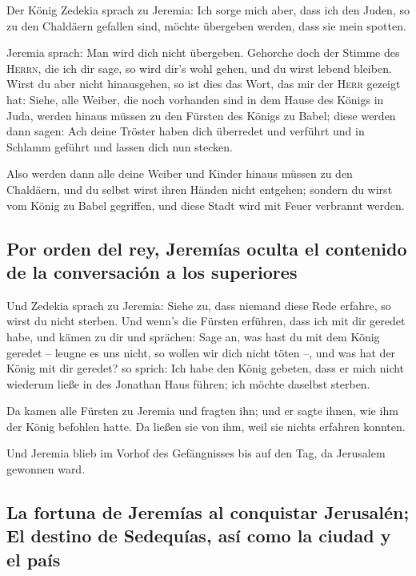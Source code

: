  Der König Zedekia sprach zu Jeremia: Ich sorge mich
aber, dass ich den Juden, so zu den Chaldäern gefallen sind, möchte
übergeben werden, dass sie mein spotten.

 Jeremia sprach: Man wird dich nicht übergeben. Gehorche
doch der Stimme des \textsc{Herrn}, die ich dir sage, so wird dir's wohl
gehen, und du wirst lebend bleiben.  Wirst du aber nicht
hinausgehen, so ist dies das Wort, das mir der \textsc{Herr} gezeigt
hat:  Siehe, alle Weiber, die noch vorhanden sind in dem
Hause des Königs in Juda, werden hinaus müssen zu den Fürsten des Königs
zu Babel; diese werden dann sagen: Ach deine Tröster haben dich
überredet und verführt und in Schlamm geführt und lassen dich nun
stecken.

 Also werden dann alle deine Weiber und Kinder hinaus
müssen zu den Chaldäern, und du selbst wirst ihren Händen nicht
entgehen; sondern du wirst vom König zu Babel gegriffen, und diese Stadt
wird mit Feuer verbrannt werden.

\hypertarget{por-orden-del-rey-jeremuxedas-oculta-el-contenido-de-la-conversaciuxf3n-a-los-superiores}{%
\subsection{Por orden del rey, Jeremías oculta el contenido de la
conversación a los
superiores}\label{por-orden-del-rey-jeremuxedas-oculta-el-contenido-de-la-conversaciuxf3n-a-los-superiores}}

 Und Zedekia sprach zu Jeremia: Siehe zu, dass niemand
diese Rede erfahre, so wirst du nicht sterben.  Und
wenn's die Fürsten erführen, dass ich mit dir geredet habe, und kämen zu
dir und sprächen: Sage an, was hast du mit dem König geredet -- leugne
es uns nicht, so wollen wir dich nicht töten --, und was hat der König
mit dir geredet?  so sprich: Ich habe den König gebeten,
dass er mich nicht wiederum ließe in des Jonathan Haus führen; ich
möchte daselbst sterben.

 Da kamen alle Fürsten zu Jeremia und fragten ihn; und er
sagte ihnen, wie ihm der König befohlen hatte. Da ließen sie von ihm,
weil sie nichts erfahren konnten.

 Und Jeremia blieb im Vorhof des Gefängnisses bis auf den
Tag, da Jerusalem gewonnen ward.

\hypertarget{la-fortuna-de-jeremuxedas-al-conquistar-jerusaluxe9n-el-destino-de-sedequuxedas-asuxed-como-la-ciudad-y-el-pauxeds}{%
\subsection{La fortuna de Jeremías al conquistar Jerusalén; El destino
de Sedequías, así como la ciudad y el
país}\label{la-fortuna-de-jeremuxedas-al-conquistar-jerusaluxe9n-el-destino-de-sedequuxedas-asuxed-como-la-ciudad-y-el-pauxeds}}


